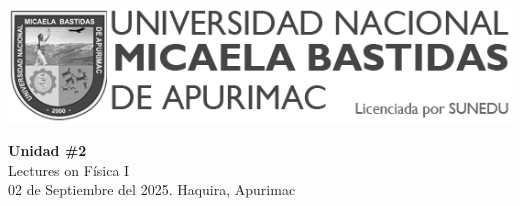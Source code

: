 


\begin{minipage}[l]{0.42\textwidth}
    \includegraphics[width=1\textwidth]{img/logo-UNAMBA.png}
\end{minipage}
\hfill
\begin{minipage}[c]{0.5\textwidth}
    \begin{flushright}
	\large{\textbf{Unidad \#2}}\\
	\large{Lectures on Física I}\\
	\large{02 de Septiembre del 2025. Haquira, Apurimac}\\
    \end{flushright}
\end{minipage}


  
